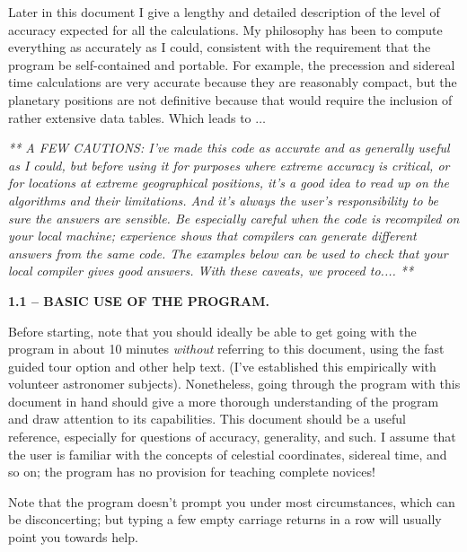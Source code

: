 Later in this document I give a lengthy and detailed description 
of the level of
accuracy expected for all the calculations.  My philosophy has been
to compute everything as accurately as I could, consistent with the
requirement that the program be self-contained and portable.  For example,
the precession and sidereal time calculations are very
accurate because they are reasonably compact, but the planetary positions 
are not definitive because that would require the 
inclusion of rather extensive data tables.  Which leads to $\ldots$

\par
{\it	
** A FEW CAUTIONS: I've made this code as accurate and
as generally useful as I could, but
before using it for purposes where extreme accuracy is critical, or for
locations at extreme geographical positions, it's a good
idea to read up on the algorithms and their limitations.  And it's
always the user's responsibility to be sure the answers are sensible.
Be especially careful when the code is recompiled on your local machine;
experience shows that compilers can generate different answers from
the same code.  The examples below can be used to check that
your local compiler gives good answers.
With these caveats, we proceed to.... **
}
\bigskip
\centerline{\bf 1.1 -- BASIC USE OF THE PROGRAM.}
\par
Before starting, note that you should ideally be
able to get going with the program in about 10 minutes
{\it without} referring to this document, using the fast guided
tour option and other help text.  
(I've established this empirically with volunteer astronomer
subjects).  Nonetheless, going through the program with this
document in hand should give a more thorough understanding of the
program and draw attention to its capabilities.
This document should be a useful reference, especially for
questions of accuracy, generality, and such.
I assume that the user is familiar with
the concepts of celestial coordinates, sidereal time, and 
so on; the program has no provision for teaching complete novices!

Note that the program doesn't prompt you under most circumstances, 
which can be disconcerting; but typing a 
few empty carriage returns in a row will
usually point you towards help.  

\par


